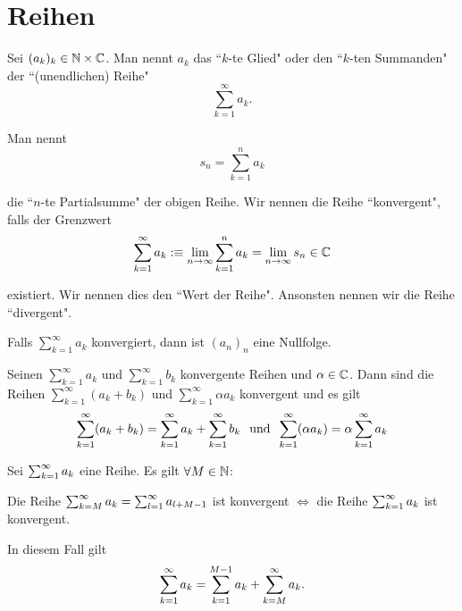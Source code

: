 \section{Reihen}


\begin{mydef}
	Sei $(a_k)_k \in \mathbb{N} \times \mathbb{C}$. Man nennt $a_k$ das ``$k$-te Glied" oder den ``$k$-ten Summanden" der ``(unendlichen) Reihe" \begin{equation}
		\sum_{k=1}^{\infty} a_k.
	\end{equation}
	
	Man nennt 
	\begin{equation}
		s_n=\sum_{k=1}^{n} a_k 
	\end{equation}
	
	die ``$n$-te Partialsumme" der obigen Reihe. Wir nennen die Reihe ``konvergent", falls der Grenzwert
	\begin{equation}
		\sum_{k=1}^\infty a_k :\equiv \lim_{n \to \infty} \sum_{k=1}^{n} a_k = \lim_{n \to \infty} s_n \in \mathbb{C}
	\end{equation}
	
	existiert. Wir nennen dies den ``Wert der Reihe". Ansonsten nennen wir die Reihe ``divergent".
\end{mydef}

\begin{thm}
	Falls $\sum_{k=1}^{\infty} a_k$ konvergiert, dann ist $(a_n)_n$ eine Nullfolge.
\end{thm}

\setcounter{thm}{5}
\begin{thm}[Linearität]
	Seinen $\sum_{k=1}^{\infty} a_k$ und $\sum_{k=1}^{\infty} b_k$ konvergente Reihen und $\alpha \in \mathbb{C}$. Dann sind die Reihen  $\sum_{k=1}^{\infty} (a_k + b_k)$ und $\sum_{k=1}^{\infty} \alpha a_k$ konvergent und es gilt
	\begin{equation}
		\sum_{k=1}^{\infty} (a_k + b_k) = \sum_{k=1}^{\infty} a_k + \sum_{k=1}^{\infty} b_k \;\;\, \text{und}\;\; \sum_{k=1}^{\infty} (\alpha a_k) = \alpha \sum_{k=1}^{\infty} a_k
	\end{equation}
\end{thm}

\setcounter{thm}{7}
\begin{thm}
	Sei $\sum_{k=1}^{\infty} a_k$ eine Reihe. Es gilt $\forall M \in \mathbb{N}$:
	
	Die Reihe $\sum_{k=M}^{\infty} a_k = \sum_{l=1}^{\infty} a_{l+M-1}$ ist konvergent $\iff$ die Reihe $\sum_{k=1}^{\infty} a_k$ ist konvergent.
	
	In diesem Fall gilt
	\begin{equation}
		\sum_{k=1}^{\infty} a_k = \sum_{k=1}^{M-1} a_k + \sum_{k=M}^{\infty} a_k.
	\end{equation}
\end{thm}

